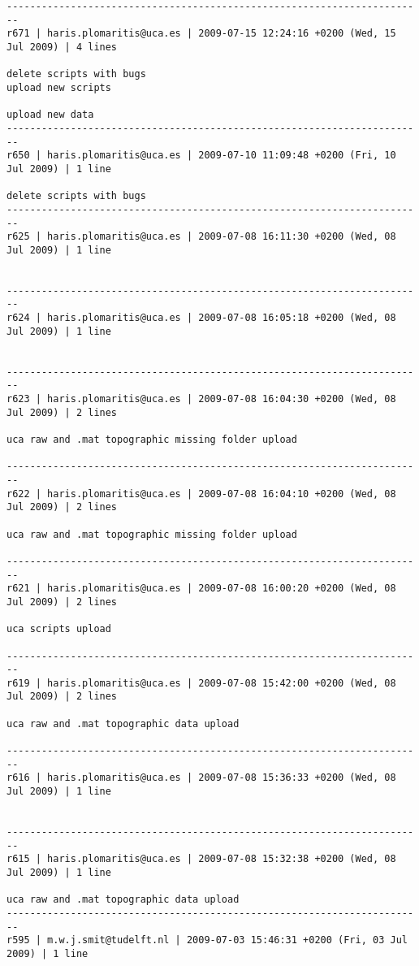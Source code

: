 \documentclass[9]{report}
\begin{document}
\begin{description}
\begin{verbatim}
------------------------------------------------------------------------
r671 | haris.plomaritis@uca.es | 2009-07-15 12:24:16 +0200 (Wed, 15 Jul 2009) | 4 lines

delete scripts with bugs
upload new scripts

upload new data 
------------------------------------------------------------------------
r650 | haris.plomaritis@uca.es | 2009-07-10 11:09:48 +0200 (Fri, 10 Jul 2009) | 1 line

delete scripts with bugs
------------------------------------------------------------------------
r625 | haris.plomaritis@uca.es | 2009-07-08 16:11:30 +0200 (Wed, 08 Jul 2009) | 1 line


------------------------------------------------------------------------
r624 | haris.plomaritis@uca.es | 2009-07-08 16:05:18 +0200 (Wed, 08 Jul 2009) | 1 line


------------------------------------------------------------------------
r623 | haris.plomaritis@uca.es | 2009-07-08 16:04:30 +0200 (Wed, 08 Jul 2009) | 2 lines

uca raw and .mat topographic missing folder upload 

------------------------------------------------------------------------
r622 | haris.plomaritis@uca.es | 2009-07-08 16:04:10 +0200 (Wed, 08 Jul 2009) | 2 lines

uca raw and .mat topographic missing folder upload 

------------------------------------------------------------------------
r621 | haris.plomaritis@uca.es | 2009-07-08 16:00:20 +0200 (Wed, 08 Jul 2009) | 2 lines

uca scripts upload 

------------------------------------------------------------------------
r619 | haris.plomaritis@uca.es | 2009-07-08 15:42:00 +0200 (Wed, 08 Jul 2009) | 2 lines

uca raw and .mat topographic data upload 

------------------------------------------------------------------------
r616 | haris.plomaritis@uca.es | 2009-07-08 15:36:33 +0200 (Wed, 08 Jul 2009) | 1 line


------------------------------------------------------------------------
r615 | haris.plomaritis@uca.es | 2009-07-08 15:32:38 +0200 (Wed, 08 Jul 2009) | 1 line

uca raw and .mat topographic data upload 
------------------------------------------------------------------------
r595 | m.w.j.smit@tudelft.nl | 2009-07-03 15:46:31 +0200 (Fri, 03 Jul 2009) | 1 line


\end{verbatim}
\end{description}
\end{document}

